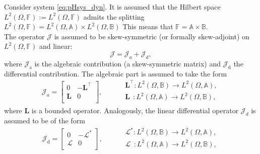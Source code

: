 \begin{assumption}\label{ass:linJ}
	Consider system \eqref{eq:pHsys_dyn}. It is assumed that the Hilbert space $L^2(\Omega, \mathbb{F}) := L^2(\Omega, \mathbb{F})$ admits the splitting $L^2(\Omega, \mathbb{F}) = L^2(\Omega, \mathbb{A}) \times L^2(\Omega, \mathbb{B})$  This means that $\mathbb{F} = \mathbb{A} \times \mathbb{B}$. \\
	
	The operator $\mathcal{J}$ is assumed to be skew-symmetric (or formally skew-adjoint) on $L^2(\Omega, \mathbb{F})$ and linear:
	\begin{equation}\label{eq:assJ}
	\mathcal{J} = \mathcal{J}_{{a}} + \mathcal{J}_{{d}},
	\end{equation}
	where $\mathcal{J}_{\text{a}}$ is the algebraic contribution (a skew-symmetric matrix) and $\mathcal{J}_{\text{d}}$ the differential contribution. The algebraic part is assumed to take the form
	\begin{equation}\label{eq:assJa}
		\mathcal{J}_{{a}} = \begin{bmatrix}
		0 & -\bm{L}^\top \\
		\bm{L} & 0 \\
		\end{bmatrix}, \qquad 
		\begin{aligned}
		&\bm{L}^\top : L^2(\Omega, \mathbb{B}) \rightarrow L^2(\Omega, \mathbb{A}), \\
		&\bm{L}\;\, : L^2(\Omega, \mathbb{A}) \rightarrow L^2(\Omega, \mathbb{B}), \\
		\end{aligned}
	\end{equation}
	where $\bm{L}$ is a bounded operator. 	Analogously, the linear differential operator $\mathcal{J}_{{d}}$ is assumed to be of the form
	\begin{equation}\label{eq:assJd}
	\mathcal{J}_{\text{d}} = 
	\begin{bmatrix}
	0 & -\mathcal{L}^* \\
	\mathcal{L} & 0 \\
	\end{bmatrix}, \qquad 
	\begin{aligned}
	&\mathcal{L}^* : L^2(\Omega, \mathbb{B}) \rightarrow L^2(\Omega, \mathbb{A}), \\
	&\mathcal{L}\;\, : L^2(\Omega, \mathbb{A}) \rightarrow L^2(\Omega, \mathbb{B}), \\
	\end{aligned}
	\end{equation}

\end{assumption}
